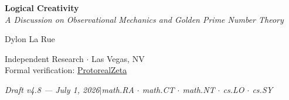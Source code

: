 \documentclass[12pt,oneside]{article}
\theoremstyle{principia}
\theoremstyle{definition}
\theoremstyle{remark}
\begin{document}
\begin{center}
\vspace*{0.5em}
{\LARGE\bfseries Logical Creativity}\\[12pt]
{\large\itshape A Discussion on Observational Mechanics and Golden Prime Number Theory}

\vspace{1.5em}
{\large Dylon La Rue}

\vspace{0.5em}
{\small Independent Research $\cdot$ Las Vegas, NV\\
Formal verification: \href{https://github.com/Dielawn-01/ProtorealZeta}{ProtorealZeta}}

\vspace{0.5em}
{\small\itshape Draft v4.8 --- July 1, 2026\quad$|$\quad math.RA $\cdot$ math.CT $\cdot$ math.NT $\cdot$ cs.LO $\cdot$ cs.SY}
\end{center}

\vspace{1em}
\end{document}
